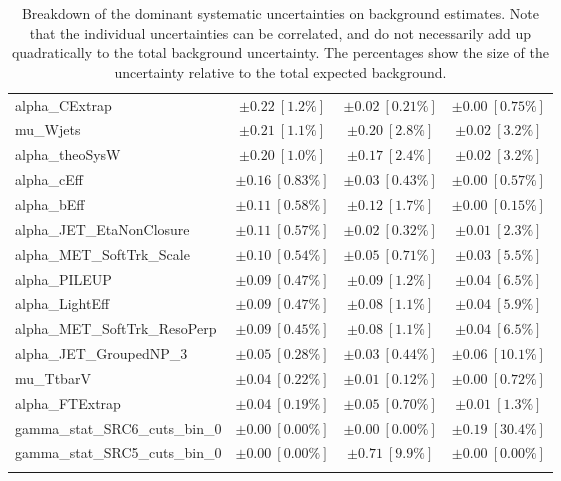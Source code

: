 \begin{table}
\begin{center}
\begin{tabular*}{\textwidth}{@{\extracolsep{\fill}}lccc}
alpha\_CExtrap         & $\pm 0.22\ [1.2\%] $          & $\pm 0.02\ [0.21\%] $          & $\pm 0.00\ [0.75\%] $       \\
mu\_Wjets         & $\pm 0.21\ [1.1\%] $          & $\pm 0.20\ [2.8\%] $          & $\pm 0.02\ [3.2\%] $       \\
alpha\_theoSysW         & $\pm 0.20\ [1.0\%] $          & $\pm 0.17\ [2.4\%] $          & $\pm 0.02\ [3.2\%] $       \\
alpha\_cEff         & $\pm 0.16\ [0.83\%] $          & $\pm 0.03\ [0.43\%] $          & $\pm 0.00\ [0.57\%] $       \\
alpha\_bEff         & $\pm 0.11\ [0.58\%] $          & $\pm 0.12\ [1.7\%] $          & $\pm 0.00\ [0.15\%] $       \\
alpha\_JET\_EtaNonClosure         & $\pm 0.11\ [0.57\%] $          & $\pm 0.02\ [0.32\%] $          & $\pm 0.01\ [2.3\%] $       \\
alpha\_MET\_SoftTrk\_Scale         & $\pm 0.10\ [0.54\%] $          & $\pm 0.05\ [0.71\%] $          & $\pm 0.03\ [5.5\%] $       \\
alpha\_PILEUP         & $\pm 0.09\ [0.47\%] $          & $\pm 0.09\ [1.2\%] $          & $\pm 0.04\ [6.5\%] $       \\
alpha\_LightEff         & $\pm 0.09\ [0.47\%] $          & $\pm 0.08\ [1.1\%] $          & $\pm 0.04\ [5.9\%] $       \\
alpha\_MET\_SoftTrk\_ResoPerp         & $\pm 0.09\ [0.45\%] $          & $\pm 0.08\ [1.1\%] $          & $\pm 0.04\ [6.5\%] $       \\
alpha\_JET\_GroupedNP\_3         & $\pm 0.05\ [0.28\%] $          & $\pm 0.03\ [0.44\%] $          & $\pm 0.06\ [10.1\%] $       \\
mu\_TtbarV         & $\pm 0.04\ [0.22\%] $          & $\pm 0.01\ [0.12\%] $          & $\pm 0.00\ [0.72\%] $       \\
alpha\_FTExtrap         & $\pm 0.04\ [0.19\%] $          & $\pm 0.05\ [0.70\%] $          & $\pm 0.01\ [1.3\%] $       \\
gamma\_stat\_SRC6\_cuts\_bin\_0         & $\pm 0.00\ [0.00\%] $          & $\pm 0.00\ [0.00\%] $          & $\pm 0.19\ [30.4\%] $       \\
gamma\_stat\_SRC5\_cuts\_bin\_0         & $\pm 0.00\ [0.00\%] $          & $\pm 0.71\ [9.9\%] $          & $\pm 0.00\ [0.00\%] $       \\
\noalign{\smallskip}\hline\noalign{\smallskip}
\end{tabular*}
\end{center}
\caption[Breakdown of uncertainty on background estimates]{
Breakdown of the dominant systematic uncertainties on background estimates.
Note that the individual uncertainties can be correlated, and do not necessarily add up quadratically to 
the total background uncertainty. The percentages show the size of the uncertainty relative to the total expected background.
\label{table.results.bkgestimate.uncertainties.SRC4_SRC5_SRC6}}
\end{table}
%